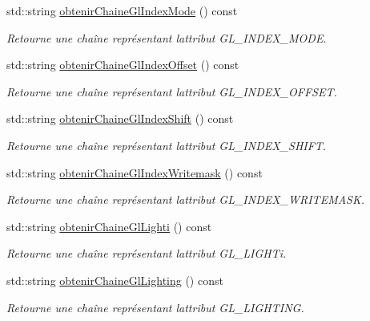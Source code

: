 \begin{DoxyCompactItemize}
std\+::string \hyperlink{group__utilitaire_ga5413d656a860db0103e85dcd025970e8}{obtenir\+Chaine\+Gl\+Index\+Mode} () const 
\begin{DoxyCompactList}\small\item\em Retourne une chaîne représentant l\textquotesingle{}attribut G\+L\+\_\+\+I\+N\+D\+E\+X\+\_\+\+M\+O\+D\+E. \end{DoxyCompactList}\item 
std\+::string \hyperlink{group__utilitaire_ga2ef77a1752dfc7df305e66d9ebc8fee0}{obtenir\+Chaine\+Gl\+Index\+Offset} () const 
\begin{DoxyCompactList}\small\item\em Retourne une chaîne représentant l\textquotesingle{}attribut G\+L\+\_\+\+I\+N\+D\+E\+X\+\_\+\+O\+F\+F\+S\+E\+T. \end{DoxyCompactList}\item 
std\+::string \hyperlink{group__utilitaire_gabb665544045af095c7c301467b71a53d}{obtenir\+Chaine\+Gl\+Index\+Shift} () const 
\begin{DoxyCompactList}\small\item\em Retourne une chaîne représentant l\textquotesingle{}attribut G\+L\+\_\+\+I\+N\+D\+E\+X\+\_\+\+S\+H\+I\+F\+T. \end{DoxyCompactList}\item 
std\+::string \hyperlink{group__utilitaire_ga7041e09cfd847b59e2fd8b306639b2e2}{obtenir\+Chaine\+Gl\+Index\+Writemask} () const 
\begin{DoxyCompactList}\small\item\em Retourne une chaîne représentant l\textquotesingle{}attribut G\+L\+\_\+\+I\+N\+D\+E\+X\+\_\+\+W\+R\+I\+T\+E\+M\+A\+S\+K. \end{DoxyCompactList}\item 
std\+::string \hyperlink{group__utilitaire_ga373300784f0f42aea9a0d6c78cb01623}{obtenir\+Chaine\+Gl\+Lighti} () const 
\begin{DoxyCompactList}\small\item\em Retourne une chaîne représentant l\textquotesingle{}attribut G\+L\+\_\+\+L\+I\+G\+H\+Ti. \end{DoxyCompactList}\item 
std\+::string \hyperlink{group__utilitaire_gac26fe35af4bad0a50b4890f21e61ea02}{obtenir\+Chaine\+Gl\+Lighting} () const 
\begin{DoxyCompactList}\small\item\em Retourne une chaîne représentant l\textquotesingle{}attribut G\+L\+\_\+\+L\+I\+G\+H\+T\+I\+N\+G. \end{DoxyCompactList}\item 

\end{DoxyCompactItemize}
